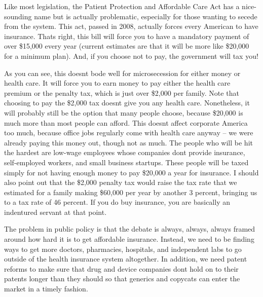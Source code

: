 \begin{policynote}
Like most legislation, the Patient Protection and Affordable Care Act
has a nice-sounding name but is
actually problematic,
especially for those wanting to secede from the system. This act,
passed in 2008, actually forces every American to have insurance.
That{\textquotesingle}s right, this bill will force you to have a
mandatory payment of over \$15,000 every year (current estimates are
that it will be more like \$20,000 for a minimum plan). And, if you
choose not to pay, the government will tax you!  

As you can see, this doesn{\textquotesingle}t bode well for
microsecession for either money or health care. It will force you to
earn money to pay either the health care premium or the penalty tax,
which is just over \$2,000 per family. Note that choosing to pay the
\$2,000 tax doesn{\textquotesingle}t give you any health care. 
Nonetheless, it will probably still be the option that many people
choose, because \$20,000 is much more than most people can afford. 
This doesn{\textquotesingle}t affect corporate America too much,
because office jobs regularly come with health care anyway – we were
already paying this money out, though not as much.  The people who will
be hit the hardest are low-wage employees whose companies
don{\textquotesingle}t provide insurance, self-employed workers, and
small business startups.  These people will be taxed simply for not
having enough money to pay \$20,000 a year for insurance.  I should
also point out that the \$2,000 penalty tax would raise the tax rate
that we estimated for a family making \$60,000 per year by another 3
percent, bringing us to a tax rate of 46 percent. If you do buy
insurance, you are basically an indentured servant at that point.

The problem in public policy is that the debate is always, always,
always framed around how hard it is to get affordable insurance.
Instead, we need to be finding ways to get more doctors, pharmacies,
hospitals, and independent labs
to go outside of the
health insurance system altogether. In addition, we need patent reforms
to make sure that drug and device companies don{\textquotesingle}t hold
on to their patents longer than they should so that generics and
copycats can enter the market in a timely fashion.
\end{policynote}

